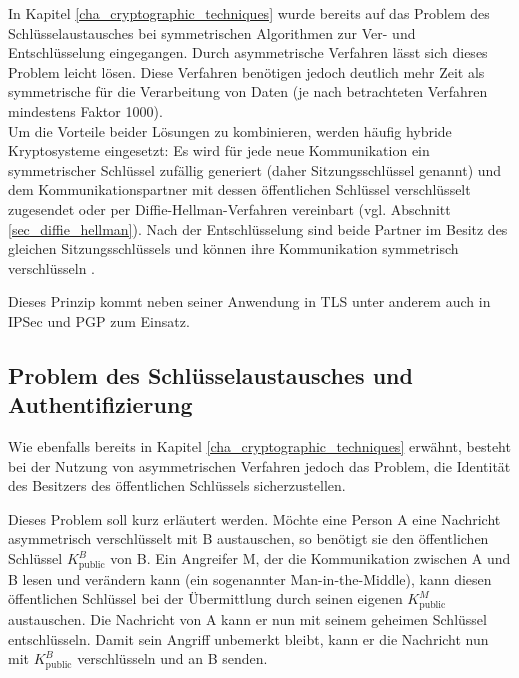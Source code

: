 In Kapitel \ref{cha_cryptographic_techniques} wurde bereits auf das Problem des Schlüsselaustausches bei symmetrischen Algorithmen zur Ver- und Entschlüsselung eingegangen. Durch asymmetrische Verfahren lässt sich dieses Problem leicht lösen. Diese Verfahren benötigen jedoch deutlich mehr Zeit als symmetrische für die Verarbeitung von Daten (je nach betrachteten Verfahren mindestens Faktor 1000). \\
Um die Vorteile beider Lösungen zu kombinieren, werden häufig hybride Kryptosysteme eingesetzt: Es wird für jede neue Kommunikation ein symmetrischer Schlüssel zufällig generiert (daher Sitzungsschlüssel genannt) und dem Kommunikationspartner mit dessen öffentlichen Schlüssel verschlüsselt zugesendet oder per Diffie-Hellman-Verfahren vereinbart (vgl. Abschnitt \ref{sec_diffie_hellman}). Nach der Entschlüsselung sind beide Partner im Besitz des gleichen Sitzungsschlüssels und können ihre Kommunikation symmetrisch verschlüsseln \cite{Schneier2006}.

Dieses Prinzip kommt neben seiner Anwendung in TLS unter anderem auch in IPSec und PGP zum Einsatz.

\subsection{Problem des Schlüsselaustausches und Authentifizierung}

Wie ebenfalls bereits in Kapitel \ref{cha_cryptographic_techniques} erwähnt, besteht bei der Nutzung von asymmetrischen Verfahren jedoch das Problem, die Identität des Besitzers des öffentlichen Schlüssels sicherzustellen.

Dieses Problem soll kurz erläutert werden. Möchte eine Person A eine Nachricht asymmetrisch verschlüsselt mit B austauschen, so benötigt sie den öffentlichen Schlüssel \(K^B_\text{public}\) von B. Ein Angreifer M, der die Kommunikation zwischen A und B lesen und verändern kann (ein sogenannter Man-in-the-Middle), kann diesen öffentlichen Schlüssel bei der Übermittlung durch seinen eigenen \(K^M_\text{public}\) austauschen. Die Nachricht von A kann er nun mit seinem geheimen Schlüssel entschlüsseln. Damit sein Angriff unbemerkt bleibt, kann er die Nachricht nun mit \(K^B_\text{public}\) verschlüsseln und an B senden.

